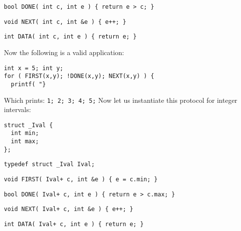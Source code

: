 \documentclass{sigplanconf}
\begin{document}
\begin{samepage}
\begin{verbatim}
bool DONE( int c, int e ) { return e > c; }
\end{verbatim}
\end{samepage}
\begin{samepage}
\begin{verbatim}
void NEXT( int c, int &e ) { e++; }
\end{verbatim}
\end{samepage}
\begin{samepage}
\begin{verbatim}
int DATA( int c, int e ) { return e; }
\end{verbatim}
\end{samepage}
Now the following is a valid application:
\begin{samepage}
\begin{verbatim}
int x = 5; int y;
for ( FIRST(x,y); !DONE(x,y); NEXT(x,y) ) {
  printf( "}
\end{verbatim}
\end{samepage}
Which prints: \verb+1; 2; 3; 4; 5;+ Now let us instantiate this
protocol for integer intervals:
\begin{samepage}
\begin{verbatim}
struct _Ival {
  int min;
  int max;
};
\end{verbatim}
\end{samepage}
\begin{samepage}
\begin{verbatim}
typedef struct _Ival Ival;
\end{verbatim}
\end{samepage}
\begin{samepage}
\begin{verbatim}
void FIRST( Ival+ c, int &e ) { e = c.min; }
\end{verbatim}
\end{samepage}
\begin{samepage}
\begin{verbatim}
bool DONE( Ival+ c, int e ) { return e > c.max; }
\end{verbatim}
\end{samepage}
\begin{samepage}
\begin{verbatim}
void NEXT( Ival+ c, int &e ) { e++; }
\end{verbatim}
\end{samepage}
\begin{samepage}
\begin{verbatim}
int DATA( Ival+ c, int e ) { return e; }
\end{verbatim}
\end{samepage}
\end{document}
